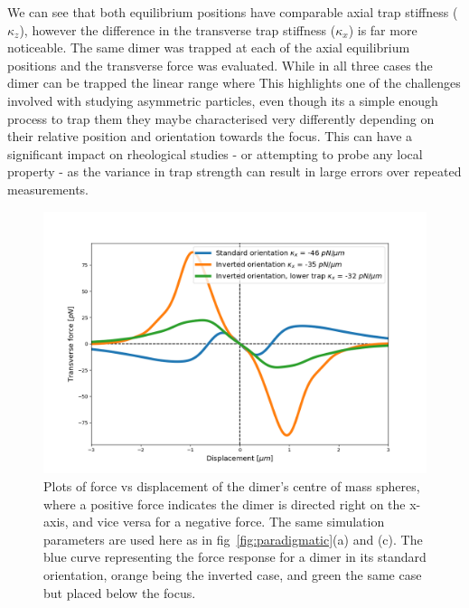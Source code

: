 We can see that both equilibrium positions have comparable axial trap 
stiffness ($\kappa_z$), however the difference in the transverse trap 
stiffness ($\kappa_x$) is far more noticeable. The same dimer was trapped
at each of the axial equilibrium positions and the transverse force was 
evaluated. While in all three cases the dimer can be trapped the linear
range where 
This highlights one of the challenges involved with studying 
asymmetric particles, even though its a simple enough process to trap them 
they maybe characterised very differently depending on their relative position 
and orientation towards the focus. This can have a significant impact on 
rheological studies - or attempting to probe any local property - as the 
variance in trap strength can result in large errors over repeated measurements. 
\begin{figure}[h!]
	\centering
	\includegraphics[width=\linewidth]{transverse_force.png}
	\caption{Plots of force vs displacement of the dimer's centre of mass spheres, 
		where a positive force indicates the dimer is directed right on the x-axis, 
		and vice versa for a negative force. The same simulation parameters are used here as in fig~\ref{fig:paradigmatic}(a) and (c). The blue curve representing the force response for a dimer in its standard orientation, orange being the inverted case, and green the same case but placed below the focus.}
	\label{fig:transverse_force}
\end{figure}

